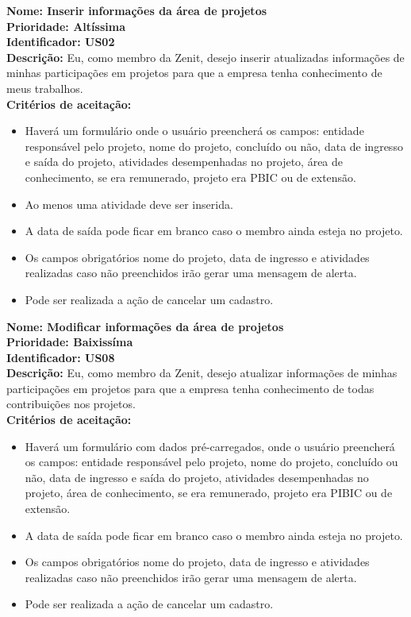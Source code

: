 \begin{anexosenv}
\indent \textbf{Nome: Inserir informações da área de projetos\\
    \indent Prioridade: Altíssima\\
    \indent Identificador: US02\\
    \indent Descrição:} Eu, como membro da Zenit, desejo inserir atualizadas informações de minhas participações em projetos para que a empresa tenha conhecimento de meus trabalhos.\\
\indent \textbf{Critérios de aceitação:}
\begin{itemize}
    \item Haverá um formulário onde o usuário preencherá os campos: entidade responsável pelo projeto, nome do projeto, concluído ou não, data de ingresso e saída do projeto, atividades desempenhadas no projeto, área de conhecimento, se era remunerado, projeto era PBIC ou de extensão.
    \item Ao menos uma atividade deve ser inserida.
    \item A data de saída pode ficar em branco caso o membro ainda esteja no projeto.
    \item Os campos obrigatórios nome do projeto, data de ingresso e atividades realizadas caso não preenchidos irão gerar uma mensagem de alerta.
    \item Pode ser realizada a ação de cancelar um cadastro.
\end{itemize}

\indent \textbf{Nome: Modificar informações da área de projetos\\
    \indent Prioridade: Baixissíma\\
    \indent Identificador: US08\\
    \indent Descrição:} Eu, como membro da Zenit, desejo atualizar informações de minhas participações em projetos para que a empresa tenha conhecimento de todas contribuições nos projetos.\\
\indent \textbf{Critérios de aceitação:}
\begin{itemize}
    \item Haverá um formulário com dados pré-carregados, onde o usuário preencherá os campos: entidade responsável pelo projeto, nome do projeto, concluído ou não, data de ingresso e saída do projeto, atividades desempenhadas no projeto, área de conhecimento, se era remunerado, projeto era PIBIC ou de extensão.
    \item A data de saída pode ficar em branco caso o membro ainda esteja no projeto.
    \item Os campos obrigatórios nome do projeto, data de ingresso e atividades realizadas caso não preenchidos irão gerar uma mensagem de alerta.
    \item Pode ser realizada a ação de cancelar um cadastro.
\end{itemize}


\end{anexosenv}
